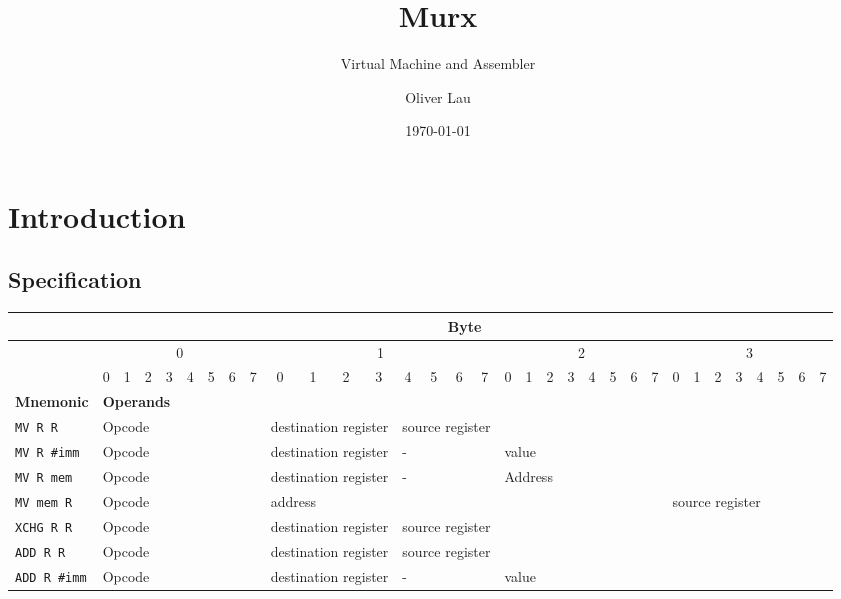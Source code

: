 \documentclass[10pt,a4paper]{scrartcl}
\title{Murx}
\subtitle{Virtual Machine and Assembler}
\author{Oliver Lau}
\date{\today}
\newcommand{\code}[1]{\texttt{#1}}
\begin{document}
\maketitle
\section{Introduction}

\subsection*{Specification}

\begin{tabular}{|l|c|c|c|c|c|c|c|c|c|c|c|c|c|c|c|c|c|c|c|c|c|c|c|c|c|c|c|c|c|c|c|c|}
    \hline
    & \multicolumn{32}{|c|}{Byte} \\ \hline
    & \multicolumn{8}{|c|}{0} & \multicolumn{8}{|c|}{1} & \multicolumn{8}{|c|}{2} & \multicolumn{8}{|c|}{3} \\ \hline 
    & 0 & 1 & 2 & 3 & 4 & 5 & 6 & 7 & 0 & 1 & 2 & 3 & 4 & 5 & 6 & 7 & 0 & 1 & 2 & 3 & 4 & 5 & 6 & 7 & 0 & 1 & 2 & 3 & 4 & 5 & 6 & 7 \\ \hline
    \textbf{Mnemonic} & \multicolumn{32}{|l|}{\textbf{Operands}} \\ \hline
    \code{MV R R} & \multicolumn{8}{|l|}{Opcode} & \multicolumn{4}{|l|}{destination register} & \multicolumn{4}{|l|}{source register} & \multicolumn{16}{|l|}{} \\ \hline
    \code{MV R \#imm} & \multicolumn{8}{|l|}{Opcode} & \multicolumn{4}{|l|}{destination register} & \multicolumn{4}{|l|}{-} & \multicolumn{16}{|l|}{value} \\ \hline
    \code{MV R mem} & \multicolumn{8}{|l|}{Opcode} & \multicolumn{4}{|l|}{destination register} & \multicolumn{4}{|l|}{-} & \multicolumn{16}{|l|}{Address} \\ \hline
    \code{MV mem R} & \multicolumn{8}{|l|}{Opcode} & \multicolumn{16}{|l|}{address} & \multicolumn{8}{|l|}{source register} \\ \hline
    \code{XCHG R R} & \multicolumn{8}{|l|}{Opcode} & \multicolumn{4}{|l|}{destination register} & \multicolumn{4}{|l|}{source register} \\ \hline
    \code{ADD R R} & \multicolumn{8}{|l|}{Opcode} & \multicolumn{4}{|l|}{destination register} & \multicolumn{4}{|l|}{source register} \\ \hline
    \code{ADD R \#imm} & \multicolumn{8}{|l|}{Opcode} & \multicolumn{4}{|l|}{destination register} & \multicolumn{4}{|l|}{-} & \multicolumn{16}{|l|}{value} \\ \hline

\end{tabular}
\end{document}
